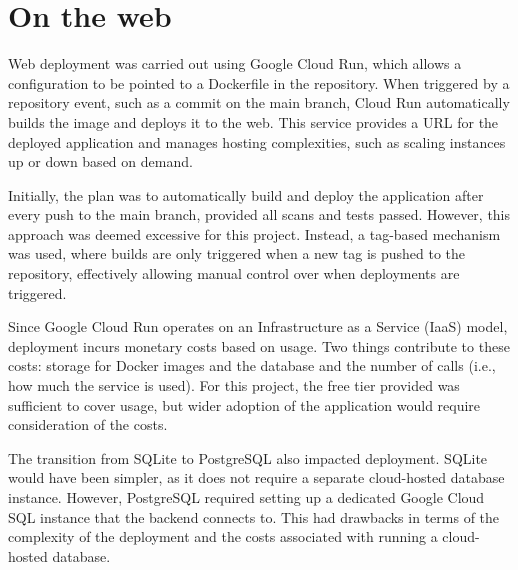 \section{On the web}
Web deployment was carried out using Google Cloud Run, which allows a configuration to be pointed to a Dockerfile in the repository. When triggered by a repository event, such as a commit on the main branch, Cloud Run automatically builds the image and deploys it to the web. This service provides a URL for the deployed application and manages hosting complexities, such as scaling instances up or down based on demand.

Initially, the plan was to automatically build and deploy the application after every push to the main branch, provided all scans and tests passed. However, this approach was deemed excessive for this project. Instead, a tag-based mechanism was used, where builds are only triggered when a new tag is pushed to the repository, effectively allowing manual control over when deployments are triggered.

Since Google Cloud Run operates on an Infrastructure as a Service (IaaS) model, deployment incurs monetary costs based on usage. Two things contribute to these costs: storage for Docker images and the database and the number of calls (i.e., how much the service is used). For this project, the free tier provided was sufficient to cover usage, but wider adoption of the application would require consideration of the costs.

The transition from SQLite to PostgreSQL also impacted deployment. SQLite would have been simpler, as it does not require a separate cloud-hosted database instance. However, PostgreSQL required setting up a dedicated Google Cloud SQL instance that the backend connects to. This had drawbacks in terms of the complexity of the deployment and the costs associated with running a cloud-hosted database.
